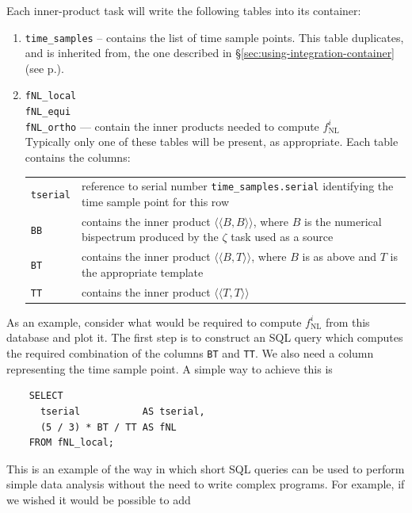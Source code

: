 \documentclass[11pt,a4paper]{article}
\newcommand{\fNL}{f_{\mathrm{NL}}}
\newcommand{\iprod}[2]{\langle\!\langle {#1}, {#2} \rangle\!\rangle}
\newenvironment{sqltablelist}{\renewcommand{\arraystretch}{1.3}\small}{}
\begin{document}
Each inner-product task will write the following tables
into its container:
\begin{sqltablelist}
\begin{enumerate}
    \item \texttt{time_samples} -- contains the list of time sample points.
	This table duplicates, and is inherited from, the one described in \S\ref{sec:using-integration-container}
	(see p.\pageref{sqltable:time-samples}).
	
	\item \texttt{fNL_local} \\
	\texttt{fNL_equi} \\
	\texttt{fNL_ortho} --- contain the inner products needed to compute $\fNL^i$ \\
	Typically only one of these tables will be present, as appropriate. Each table contains the columns: \\
	\begin{tabular}{p{2.5cm}p{11.5cm}}
	   \texttt{tserial} & reference to serial number \texttt{time_samples.serial}
	   identifying the time sample point for this row \\
	   \texttt{BB} & contains the inner product $\iprod{B}{B}$, where $B$ is the numerical
	   bispectrum produced by the $\zeta$ task used as a source \\
	   \texttt{BT} & contains the inner product $\iprod{B}{T}$, where $B$ is as above and
	   $T$ is the appropriate template \\
	   \texttt{TT} & contains the inner product $\iprod{T}{T}$ 
	\end{tabular}
\end{enumerate}
\end{sqltablelist}
As an example, consider what would be required to compute
$\fNL^i$ from this database and plot it.
The first step is to construct an SQL query which computes the
required combination
of the columns \texttt{BT}
and \texttt{TT}.
We also need a column representing the time sample point.
A simple way to achieve this is
\begin{verbatim}
    SELECT
      tserial           AS tserial,
      (5 / 3) * BT / TT AS fNL
    FROM fNL_local;
\end{verbatim}
This is an example of the way in which short SQL queries can be used
to perform simple data analysis without
the need to write complex programs.
For example, if we wished it would be possible to add
\end{document}
